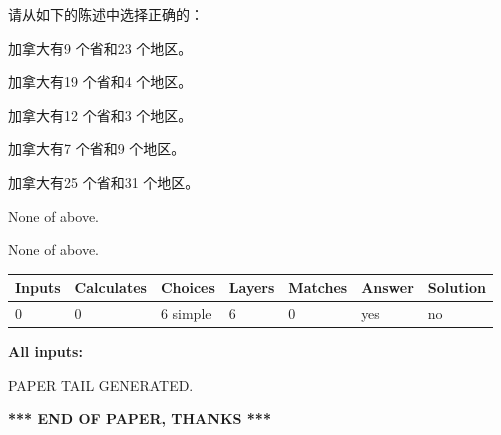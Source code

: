 \documentclass{ctexart}
\begin{document}
  
请从如下的陈述中选择正确的：
 
 
加拿大有9 个省和23 个地区。
 
 
加拿大有19 个省和4 个地区。
 
 
加拿大有12 个省和3 个地区。
 
 
加拿大有7 个省和9 个地区。
 
 
加拿大有25 个省和31 个地区。
 
 
 None of above.
 
 
\noindent{}
 
 
 None of above.
 
 
\noindent{}
 
 
   
   
   
   
\noindent\begin{tabular}{|l|l|l|l|l|l|l|}
 \hline
Inputs & Calculates & Choices & Layers & Matches & Answer & Solution \\ \hline
 0  & 
 0  & 
 6
  simple  
  & 
 6  & 
 0  & 
  yes & 
  no 
  \\ \hline
 \end{tabular}
   
   
   
   
\noindent{}
   
   
   
   
\noindent\vspace{0.1in}\hspace{-0.08in} {\textbf{\Large{All inputs: }}}
   
   
   
   
   
   
 \vspace{0.2in}
 
   
   
\vspace{2.0in} PAPER TAIL GENERATED.
   
   
   
   
\vspace{1.0in} 
{\textbf{\large{ *** END OF PAPER, THANKS *** }}} 
   
\end{document}
